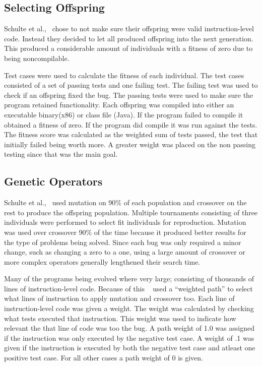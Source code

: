 \documentclass{sig-alternate}
\begin{document}
\subsection{Selecting Offspring } 
Schulte et al.,~\cite{Assembly:2010} chose to not make sure their offspring were valid instruction-level code. Instead they decided to let all produced offspring into the next generation. This produced a considerable amount of individuals with a fitness of zero due to being noncompilable.

Test cases were used to calculate the fitness of each individual. The test cases consisted of a set of passing tests and one failing test. The failing test was used to check if an offspring fixed the bug. The passing tests were used to make sure the program retained functionality. Each offspring was compiled into either an executable binary(x86) or class file (Java). If the program failed to compile it obtained a fitness of zero. If the program did compile it was run against the tests. The fitness score was calculated as the weighted sum of tests passed, the test that initially failed being worth more. A greater weight was placed on the non passing testing since that was the main goal.

\subsection{Genetic Operators}
Schulte et al.,~\cite{Assembly:2010} used mutation on 90\% of each population and crossover on the rest to produce the offspring population. Multiple tournaments consisting of three individuals were performed to select fit individuals for reproduction. Mutation was used over crossover 90\% of the time because it produced better results for the type of problems being solved. Since each bug was only required a minor change, such as changing a zero to a one, using a large amount of crossover or more complex operators generally lengthened their search time.

Many of the programs being evolved where very large; consisting of thousands of lines of instruction-level code. Because of this ~\cite{Assembly:2010} used a ``weighted path'' to select what lines of instruction to apply mutation and crossover too. Each line of instruction-level code was given a weight. The weight was calculated by checking what tests executed that instruction. This weight was used to indicate how relevant the that line of code was too the bug. A path weight of 1.0 was assigned if the instruction was only executed by the negative test case. A weight of .1 was given if the instruction is executed by both the negative test case and atleast one positive test case. For all other cases a path weight of 0 is given.
\end{document}
